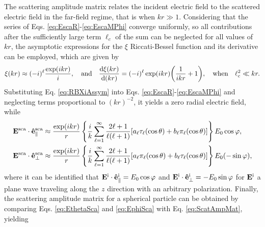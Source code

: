 The scattering amplitude matrix relates the incident electric field to the scattered electric field in the far-field regime, that is when $kr\gg 1$. Considering that the series of Eqs. \eqref{eq:EscaR}-\eqref{eq:EscaMPhi} converge uniformly, so all contributions after the sufficiently large  term $\ell_c$ of the sum can be neglected for all values of $kr$, the asymptotic  expressions for the $\xi$ Riccati-Bessel function and its derivative can be employed, which are given by \cite{bohren_absorption_1983}
%
%
%
\begin{align}
\xi(kr)\approx (-i)^\ell \frac{\exp(ikr)}{i},
\qqtext{and}
\dv{\xi(kr)}{(kr)} = (-i)^\ell \exp(ikr)\qty(\frac{1}{i kr} + 1),
\qqtext{when}
\ell_c^2\ll kr.
\label{eq:RBXiAssym}
\end{align}
%
%
Substituting Eq. \eqref{eq:RBXiAssym} into  Eqs. \eqref{eq:EscaR}-\eqref{eq:EscaMPhi} and neglecting terms proportional to $(kr)^{-2}$, it yields a zero radial electric field, while
%
\begin{subequations}%
\begin{align}
\vb{E}^\text{sca}\cdot\vu{e}^\text{sca}_\parallel & \approx \frac{\exp(ikr)}{r}
\left\{\frac{i}{k}\sum_{\ell = 1}^\infty \frac{2\ell+1}{\ell(\ell+1)}
						[a_\ell\tau_\ell(\cos\theta)+b_\ell\pi_\ell(\cos\theta)]
				\right\}E_0\cos\varphi,
\label{eq:EthetaSca}\\
\vb{E}^\text{sca}\cdot\vu{e}^\text{sca}_\perp &\approx \frac{\exp(ikr)}{r}
\left\{\frac{i}{k}\sum_{\ell = 1}^\infty \frac{2\ell+1}{\ell(\ell+1)}
						[a_\ell\pi_\ell(\cos\theta)+b_\ell\tau_\ell(\cos\theta)]
				\right\}E_0(-\sin\varphi),
\label{eq:EphiSca}%
\end{align}\label{eq:EFar}%
\end{subequations}
%
\noindent
where it can be identified that $\vb{E}^\text{i}\cdot \vu{e}^\text{i}_\parallel = E_0\cos\varphi$ and $\vb{E}^\text{i}\cdot \vu{e}^\text{i}_\perp = -E_0\sin\varphi$ for $\vb{E}^\text{i}$ a plane wave traveling along the $z$ direction with an arbitrary polarization. Finally, the scattering amplitude matrix for a spherical particle can be obtained by comparing Eqs. \eqref{eq:EthetaSca} and \eqref{eq:EphiSca} with Eq. \eqref{eq:ScatAmpMat}, yielding
%
%
%
